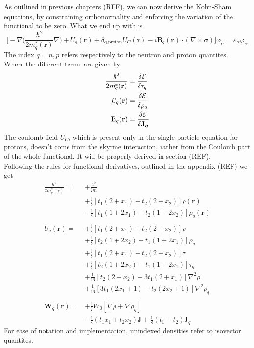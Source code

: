 As outlined in previous chapters (REF), we can now derive the Kohn-Sham equations, by constraining orthonormality and enforcing the variation of the functional to be zero. What we end up with is
\begin{equation}
    \bigg[-\nabla\bigg(\frac{\hbar^2}{2m^{*}_q(\mathbf r)}\nabla \bigg) + U_q(\mathbf r) + \delta_{\text{q,proton}}U_C(\mathbf r)-i\mathbf B_q(\mathbf r)\cdot(\nabla \times \boldsymbol\sigma) \bigg]\varphi_\alpha=\varepsilon_\alpha\varphi_\alpha
\end{equation}
The index $q=n,p$ refers respectively to the neutron and proton quantites.
\\Where the different terms are given by
\begin{align}
    \frac{\hbar^2}{2m^{*}_q(\mathbf r)} &= \fdv{\mathcal E}{\tau_q}
    \\U_q(\mathbf r) &= \fdv{\mathcal E}{\rho_q}\label{eq:fdv_rho_skyrme}
    \\\mathbf B_q(\mathbf r) &= \fdv{\mathcal E}{\boldsymbol{\mathbf J_q}}
\end{align}
The coulomb field $U_C$, which is present only in the single particle equation for protons, doesn't come from the skyrme interaction, rather from the Coulomb part of the whole functional. It will be properly derived in section (REF).
\\Following the rules for functional derivatives, outlined in the appendix (REF) we get
\begin{align}
    \frac{\hbar^2}{2m_q^*(\mathbf r)} =& +\frac{\hbar^2}{2m} \\&+ \frac 1 8 [t_1(2+x_1)+t_2(2+x_2)]\rho(\mathbf r) \\&- \frac 1 8 [t_1(1+2x_1)+t_2(1+2x_2)]\rho_q(\mathbf r ) \\\\
    U_q(\mathbf r) =& +\frac 1 8 [t_1(2+x_1)+t_2(2+x_2)]\rho \\&+ \frac 1 8 [t_2(1+2x_2)-t_1(1+2x_1)]\rho_q \\
    &+ \frac 1 8 [t_1(2+x_1)+t_2(2+x_2)]\tau \\&+ \frac 1 8 [t_2(1+2x_2)-t_1(1+2x_1)]\tau_q \\
    &+ \frac 1 {16} [t_2(2+x_2)-3t_1(2+x_1)] \nabla^2 \rho \\&+ \frac 1 {16} [3t_1(2x_1+1)+t_2(2x_2+1)] \nabla^2 \rho_q \\\\
    \mathbf W_q (\mathbf r ) = &+\frac 1 2 W_0 [\nabla\rho + \nabla \rho_q] \\&-\frac 1 8 (t_1 x_1 + t_2 x_2) \mathbf J + \frac 1 8 (t_1 - t_2) \mathbf J_q 
\end{align}
For ease of notation and implementation, unindexed densities refer to isovector quantites.